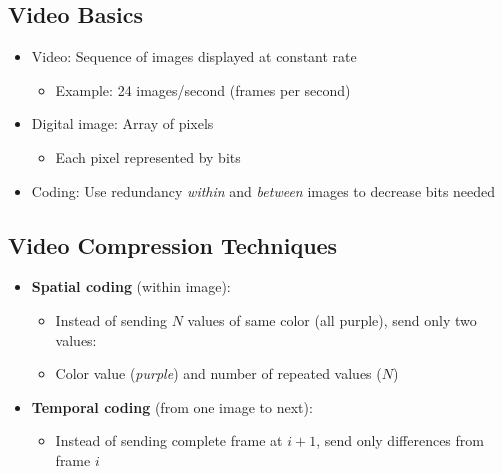 \documentclass[12pt]{article}
\begin{document}
\subsection{Video Basics}
\begin{itemize}
    \item Video: Sequence of images displayed at constant rate
          \begin{itemize}
              \item Example: 24 images/second (frames per second)
          \end{itemize}

    \item Digital image: Array of pixels
          \begin{itemize}
              \item Each pixel represented by bits
          \end{itemize}

    \item Coding: Use redundancy \textit{within} and \textit{between} images to decrease bits needed
\end{itemize}

\subsection{Video Compression Techniques}
\begin{itemize}
    \item \textbf{Spatial coding} (within image):
          \begin{itemize}
              \item Instead of sending $N$ values of same color (all purple), send only two values:
              \item Color value (\textit{purple}) and number of repeated values ($N$)
          \end{itemize}

    \item \textbf{Temporal coding} (from one image to next):
          \begin{itemize}
              \item Instead of sending complete frame at $i+1$, send only differences from frame $i$
          \end{itemize}
\end{itemize}
\end{document}
